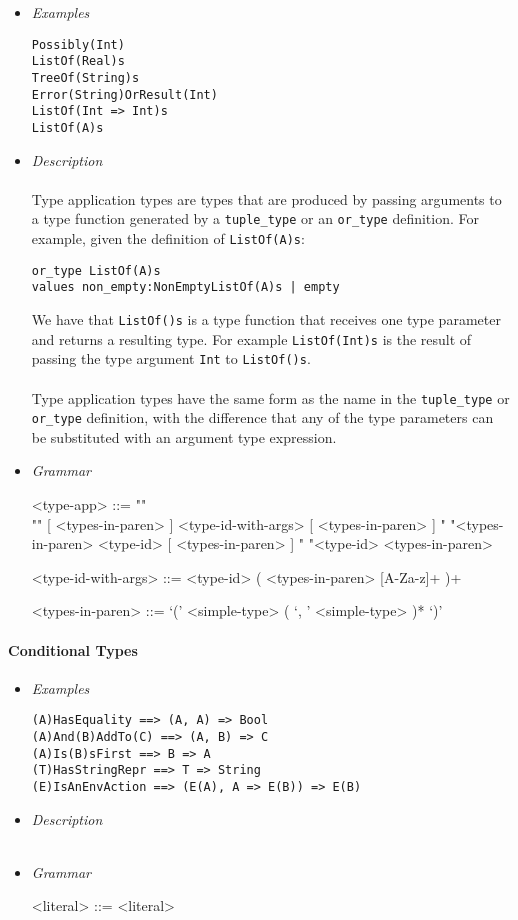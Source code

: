 \documentclass{article}
\begin{document}
\begin{itemize}
\item \textit{Examples}
\begin{verbatim}
Possibly(Int)
ListOf(Real)s
TreeOf(String)s 
Error(String)OrResult(Int)
ListOf(Int => Int)s
ListOf(A)s
\end{verbatim}

\item \textit{Description} \\\\
Type application types are types that are produced by passing arguments
to a type function generated by a \texttt{tuple_type} or an \texttt{or_type}
definition. For example, given the definition of \texttt{ListOf(A)s}:
\begin{verbatim}
or_type ListOf(A)s
values non_empty:NonEmptyListOf(A)s | empty
\end{verbatim}
We have that \texttt{ListOf()s} is a type function that receives one type parameter
and returns a resulting type. For example \texttt{ListOf(Int)s} is the result
of passing the type argument \texttt{Int} to \texttt{ListOf()s}.
\\\\
Type application types have the same form as the name in the
\texttt{tuple_type} or \texttt{or_type} definition, with the difference that
any of the type parameters can be substituted with an argument type expression.

\item \textit{Grammar}
\begin{grammar}
<type-app> ::= ""\\""
[ <types-in-paren> ] <type-id-with-args> [ <types-in-paren> ]
\alt " "<types-in-paren> <type-id> [ <types-in-paren> ]
\alt " "<type-id> <types-in-paren>

<type-id-with-args> ::= 
<type-id> ( <types-in-paren> [A-Za-z]+ )+

<types-in-paren> ::= `(' <simple-type> ( `, ' <simple-type> )* `)'
\end{grammar}
\end{itemize}

\paragraph{Conditional Types}

\begin{itemize}
\item \textit{Examples}
\begin{verbatim}
(A)HasEquality ==> (A, A) => Bool
(A)And(B)AddTo(C) ==> (A, B) => C
(A)Is(B)sFirst ==> B => A
(T)HasStringRepr ==> T => String
(E)IsAnEnvAction ==> (E(A), A => E(B)) => E(B)
\end{verbatim}

\item \textit{Description} \\\\
\item \textit{Grammar}
\begin{grammar}
<literal> ::= <literal>
\end{grammar}
\end{itemize}
\end{document}
